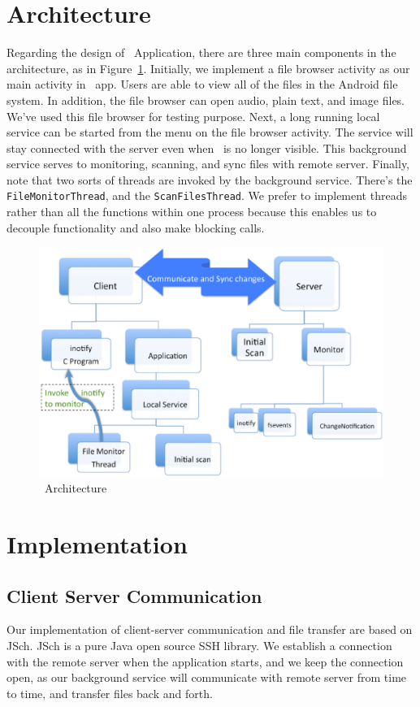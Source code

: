 \section{Architecture}
\label{sec:Architecture}
Regarding the design of \teledroid\ Application, there are three main components in the architecture, as in 
Figure~\ref{fig:architecture}. Initially, we implement a file browser activity as our main activity in \teledroid\ app. 
Users are able to view all of the files in the Android file system. In addition, the file browser can open 
audio, plain text, and image files. We've used this file browser for testing purpose. Next, a long running local 
service can be started from the menu on the file browser activity. The service will stay connected with the server even when 
\teledroid\ is no longer visible. This background service serves to monitoring, scanning, and 
sync files with remote server. Finally, note that two sorts of threads are invoked by the background service. 
There's the \verb+FileMonitorThread+, and the \verb+ScanFilesThread+. We prefer to implement threads rather than all the
functions within one process because this enables us to decouple functionality and also make blocking calls.

\begin{figure}[htp]
\centering
\includegraphics[scale=0.5]{architecture}
\caption{\teledroid\ Architecture}\label{fig:architecture}
\end{figure}

\section{Implementation}
\label{sec:Implementation}
\subsection{Client Server Communication}
Our implementation of client-server communication and file transfer are based on JSch. JSch is a pure Java open source SSH library. We establish a connection with the remote server when the \teledroid application starts, and we keep the connection open, as our background service will communicate with remote server from time to time, and transfer files back and forth. 

